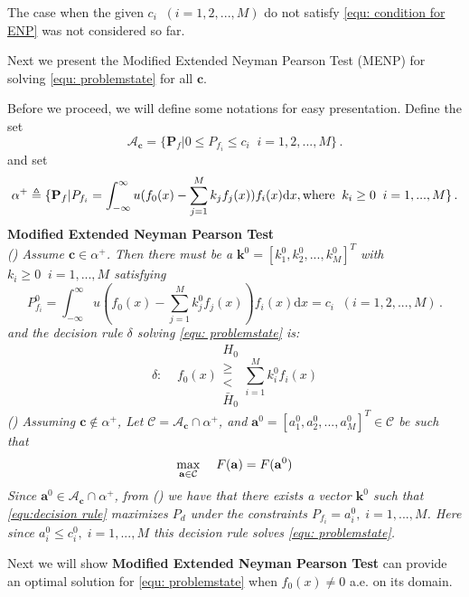 The case when the given $c_i\;\; (i= 1, 2, ..., M)$ do not satisfy \eqref{equ: condition for ENP} was not considered so far. 

Next we present the Modified Extended Neyman Pearson Test (MENP) for solving \eqref{equ: problemstate} for all $\mathbf{c}$.

Before we proceed, we will define some notations for easy presentation.
Define the set 
\[\mathcal{A}_\mathbf{c} = \{
  \mathbf{P}_f | 0 \leq P_{f_i} \leq c_i
  \;\;i=1, 2, ..., M\}\,.
\]
and set 
\[
\alpha^+ \triangleq \{\mathbf{P}_f | P_{f_i} = \int_{-\infty}^{\infty} u(f_0(x) - \sum_{j=1}^{M}k_j f_j(x)) f_i(x) \mathrm{d}x, \text{where\;\;} k_i \geq 0 \;\;i=1, ..., M\}\,.
\]
\noindent \textbf{Modified Extended Neyman Pearson Test}
\noindent \textit{
\\\textnormal{()} Assume $\mathbf{c} \in \alpha^+$. Then there must be a $\mathbf{k}^0 = [k_1^0, k_2^0, ..., k_M^0]^T$ with $k_i \geq 0\;\;i=1, ..., M$ satisfying
}
\begin{equation}
\label{equ:Pf}
  P_{f_i}^0 = \int_{-\infty}^{\infty} u(f_0(x) - \sum_{j=1}^{M}k_j^0f_j(x))f_i(x)\mathrm{d}x = c_i \;\; (i= 1, 2, ..., M)\,.
\end{equation}
\textit{
    and the decision rule $\delta $ solving  \eqref{equ: problemstate} is:
}
\begin{equation}
\label{equ:decision rule}
\delta:\;\;\;\;f_0(x) \substack{H_0 \\ \geq \\ < \\ \bar{H}_0} \sum_{i=1}^{M}k_i^0f_i(x)
\end{equation}
\textit{
\noindent \textnormal{()} Assuming $\mathbf{c} \notin \alpha^+$, Let $\mathcal{C} = \mathcal{A}_{\mathbf{c}} \cap \alpha^+$, and $\mathbf{a}^0 = [a_1^0, a_2^0, ..., a_M^0]^T \in \mathcal{C}$ be such that
}
\begin{equation}
\label{equ: F0}
\max_{\mathbf{a} \in \mathcal{C}}\;\;\;\;F(\mathbf{a}) = F(\mathbf{a}^0)\\
\end{equation}
\textit{
Since $\mathbf{a}^0 \in \mathcal{A}_{\mathbf{c}} \cap \alpha^+$, from \textnormal{()} we have that there exists a vector $\mathbf{k}^0$ such that \eqref{equ:decision rule}  maximizes $P_d$ under the constraints $P_{f_i} = a_i^0, \;i=1, ..., M$. Here since $a_i^0 \leq c_i^0, \;i=1, ..., M$ this decision rule  solves \eqref{equ: problemstate}.
}

Next we will show \textbf{Modified Extended Neyman Pearson Test} can provide an optimal solution for \eqref{equ: problemstate} when $f_0(x) \neq 0$ a.e. on its domain.

